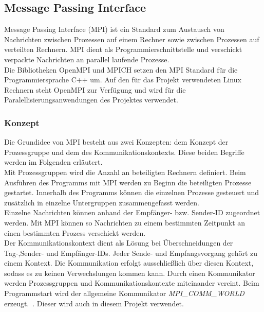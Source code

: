\subsection{Message Passing Interface}
Message Passing Interface (MPI) ist ein Standard zum Austausch von Nachrichten zwischen Prozessen auf einem Rechner sowie zwischen Prozessen auf verteilten Rechnern. MPI dient als Programmierschnittstelle und verschickt verpackte Nachrichten an parallel laufende Prozesse.\\
Die Bibliotheken OpenMPI und MPICH setzen den MPI Standard für die Programmiersprache C++ um.
Auf den für das Projekt verwendeten Linux Rechnern steht OpenMPI zur Verfügung und wird für die Paralellisierungsanwendungen des Projektes verwendet.\\ 
\subsubsection{Konzept}
Die Grundidee von MPI besteht aus zwei Konzepten: dem Konzept der Prozessgruppe und dem des Kommunikationskontexts. Diese beiden Begriffe werden im Folgenden erläutert.
\\
Mit Prozessgruppen wird die Anzahl an beteiligten Rechnern definiert. Beim Ausführen des Programms mit MPI werden zu Beginn die beteiligten Prozesse gestartet. Innerhalb des Programms können die einzelnen Prozesse gesteuert und zusätzlich in einzelne Untergruppen zusammengefasst werden.
\\
Einzelne Nachrichten können anhand der Empfänger- bzw. Sender-ID zugeordnet werden. Mit MPI können so Nachrichten zu einem bestimmten Zeitpunkt an einen bestimmten Prozess verschickt werden.\\
Der Kommunikationskontext dient als Lösung bei Überschneidungen der Tag-,Sender- und Empfänger-IDs. Jeder Sende- und Empfangsvorgang gehört zu einem Kontext. Die Kommunikation erfolgt ausschließlich über diesen Kontext, sodass es zu keinen Verwechslungen kommen kann.
Durch einen Kommunikator werden Prozessgruppen und Kommunikationskontexte miteinander vereint. Beim Programmstart wird der allgemeine Kommunikator \textit{MPI\_COMM\_WORLD} erzeugt.~\cite{b1}. Dieser wird auch in diesem Projekt verwendet.\\
